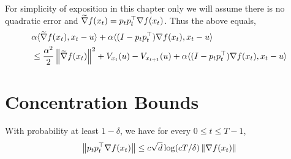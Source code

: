    For simplicity of exposition in this chapter only we will assume there is no quadratic error and $\widetilde{\nabla} f(x_t) = p_tp_t^\top \nabla f(x_t)$. Thus the above equals,
    \begin{align}
        &\alpha \langle \widetilde{\nabla} f(x_t), x_t-u \rangle + \alpha \langle (I-p_tp_t^\top) \nabla f(x_t), x_t-u \rangle \notag \\
        &\leq \frac{\alpha^2}{2} \left\lVert \widetilde{\nabla} f(x_t) \right\rVert^2 + V_{x_t}(u) - V_{x_{t+1}}(u) + \alpha \langle (I-p_tp_t^\top) \nabla f(x_t), x_t-u \rangle \label{eq:telescope}
    \end{align}

    \section{Concentration Bounds}
    \begin{lemma}
        \label{lem:est-bound}
        With probability at least $1-\delta$, we have for every $0 \leq t \leq T-1$,
        \begin{align*}
            \left\lVert p_tp_t^\top \nabla f(x_t) \right\rVert \leq c \sqrt{d} \log(cT/\delta) \left\lVert \nabla f(x_t) \right\rVert
        \end{align*}
    \end{lemma}
